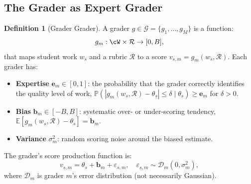 \documentclass[11pt,a4paper]{article}
\theoremstyle{definition}
\newtheorem{definition}[theorem]{Definition}
\theoremstyle{remark}
\newcommand{\E}{\mathbb{E}}
\newcommand{\Pbb}{\mathbb{P}}
\newcommand{\cD}{\mathcal{D}}
\newcommand{\cG}{\mathcal{G}}
\newcommand{\cR}{\mathcal{R}}
\newcommand{\rubric}{\cR}
\newcommand{\graderSet}{\cG}
\newcommand{\trueScore}{\theta}
\newcommand{\expertiseVec}{\mathbf{e}}
\newcommand{\biasVec}{\mathbf{b}}
\begin{document}
\subsection{The Grader as Expert Grader}
\begin{definition}[Grader Grader]
\label{def:grader}
A grader $g \in \graderSet = \{g_1, \ldots, g_M\}$ is a function:
\begin{equation}
    g_m: \cW \times \rubric \to [0, B],
\end{equation}
that maps student work $w_s$ and a rubric $\rubric$ to a score $v_{s,m} = g_m(w_s, \rubric)$. Each grader has:
\begin{itemize}[nosep]
    \item \textbf{Expertise } $\expertiseVec_m \in [0,1]$: the probability that the grader correctly identifies the quality level of work, $\Pbb(|g_m(w_s, \rubric) - \trueScore_s| \le \delta \mid \trueScore_s) \ge \expertiseVec_m$ for $\delta > 0$.
    \item \textbf{Bias } $\biasVec_m \in [-B, B]$: systematic over- or under-scoring tendency, $\E[g_m(w_s, \rubric) - \trueScore_s] = \biasVec_m$.
    \item \textbf{Variance } $\sigma_m^2$: random scoring noise around the biased estimate.
\end{itemize}
\end{definition}
The grader's score production function is:
\begin{equation}
    v_{s,m} = \trueScore_s + \biasVec_m + \varepsilon_{s,m}, \quad \varepsilon_{s,m} \sim \cD_m(0, \sigma_m^2),
\end{equation}
where $\cD_m$ is grader $m$'s error distribution (not necessarily Gaussian).
\end{document}
